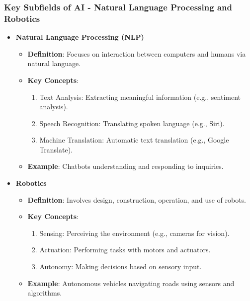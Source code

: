 \documentclass[aspectratio=169]{beamer}
\begin{document}
\begin{frame}[fragile]
    \frametitle{Key Subfields of AI - Natural Language Processing and Robotics}
    \begin{itemize}
        \item \textbf{Natural Language Processing (NLP)}
        \begin{itemize}
            \item \textbf{Definition}: Focuses on interaction between computers and humans via natural language.
            \item \textbf{Key Concepts}:
                \begin{enumerate}
                    \item Text Analysis: Extracting meaningful information (e.g., sentiment analysis).
                    \item Speech Recognition: Translating spoken language (e.g., Siri).
                    \item Machine Translation: Automatic text translation (e.g., Google Translate).
                \end{enumerate}
            \item \textbf{Example}: Chatbots understanding and responding to inquiries.
        \end{itemize}
        
        \item \textbf{Robotics}
        \begin{itemize}
            \item \textbf{Definition}: Involves design, construction, operation, and use of robots.
            \item \textbf{Key Concepts}:
                \begin{enumerate}
                    \item Sensing: Perceiving the environment (e.g., cameras for vision).
                    \item Actuation: Performing tasks with motors and actuators.
                    \item Autonomy: Making decisions based on sensory input.
                \end{enumerate}
            \item \textbf{Example}: Autonomous vehicles navigating roads using sensors and algorithms.
        \end{itemize}
    \end{itemize}
\end{frame}
\end{document}
